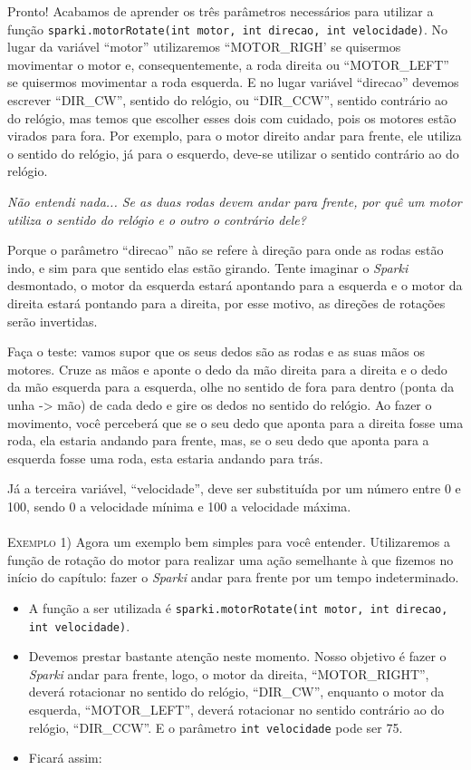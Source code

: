 Pronto! Acabamos de aprender os três parâmetros necessários para utilizar a função \texttt{sparki.motorRotate(int motor, int direcao, int velocidade)}. No lugar da variável ``motor'' utilizaremos ``MOTOR\_RIGH' se quisermos movimentar o motor e, consequentemente, a roda direita ou ``MOTOR\_LEFT'' se quisermos movimentar a roda esquerda. E no lugar variável ``direcao'' devemos escrever ``DIR\_CW'', sentido do relógio, ou ``DIR\_CCW'', sentido contrário ao do relógio, mas temos que escolher esses dois com cuidado, pois os motores estão virados para fora. Por exemplo, para o motor direito andar para frente, ele utiliza o sentido do relógio, já para o esquerdo, deve-se utilizar o sentido contrário ao do relógio.

\textit{Não entendi nada... Se as duas rodas devem andar para frente, por quê um motor utiliza o sentido do relógio e o outro o contrário dele?}

Porque o parâmetro ``direcao'' não se refere à direção para onde as rodas estão indo, e sim para que sentido elas estão girando. Tente imaginar o \textsl{Sparki} desmontado, o motor da esquerda estará apontando para a esquerda e o motor da direita estará pontando para a direita, por esse motivo, as direções de rotações serão invertidas. 

Faça o teste: vamos supor que os seus dedos são as rodas e as suas mãos os motores. Cruze as mãos e aponte o dedo da mão direita para a direita e o dedo da mão esquerda para a esquerda, olhe no sentido de fora para dentro (ponta da unha -> mão) de cada dedo e gire os dedos no sentido do relógio. Ao fazer o movimento, você perceberá que se o seu dedo que aponta para a direita fosse uma roda, ela estaria andando para frente, mas, se o seu dedo que aponta para a esquerda fosse uma roda, esta estaria andando para trás.

Já a terceira variável, ``velocidade'', deve ser substituída por um número entre 0 e 100, sendo 0 a velocidade mínima e 100 a velocidade máxima.
\\
\\
\textsc{Exemplo 1)} Agora um exemplo bem simples para você entender. Utilizaremos a função de rotação do motor para realizar uma ação semelhante à que fizemos no início do capítulo: fazer o \textsl{Sparki} andar para frente por um tempo indeterminado.
        
\begin{itemize}
    \item A função a ser utilizada é \texttt{sparki.motorRotate(int motor, int direcao, int velocidade)}.
    \item Devemos prestar bastante atenção neste momento. Nosso objetivo é fazer o \textsl{Sparki} andar para frente, logo, o motor da direita, ``MOTOR\_RIGHT'', deverá rotacionar no sentido do relógio, ``DIR\_CW'', enquanto o motor da esquerda, ``MOTOR\_LEFT'', deverá rotacionar no sentido contrário ao do relógio, ``DIR\_CCW''. E o parâmetro \texttt{int velocidade} pode ser 75.
    \item Ficará assim:
\end{itemize}
    
